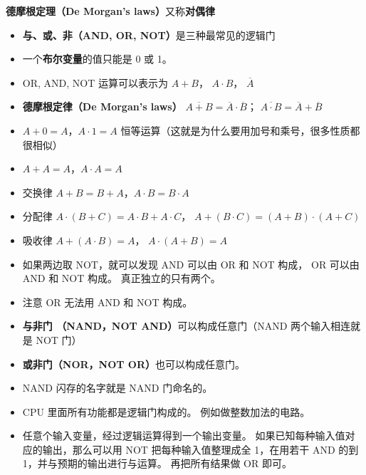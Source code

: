 
\begin{issues}
\issueDraft
\end{issues}

\textbf{德摩根定理（De Morgan's laws）}又称\textbf{对偶律}

\begin{itemize}
\item \textbf{与、或、非（AND, OR, NOT）}是三种最常见的逻辑门
\item 一个\textbf{布尔变量}的值只能是 0 或 1。
\item OR, AND, NOT 运算可以表示为 $A + B$， $A\cdot B$， $\overline A$
\item \textbf{德摩根定律（De Morgan's laws）} $\overline{A+B} = \overline A \cdot \overline B$； $\overline{A \cdot B} = \overline A + \overline B$
\item $A+0=A$，$A\cdot 1=A$ 恒等运算（这就是为什么要用加号和乘号，很多性质都很相似）
\item $A+A=A$，$A\cdot A=A$
\item 交换律 $A+B=B+A$，$A\cdot B=B\cdot A$
\item 分配律 $A\cdot(B+C)=A\cdot B+A\cdot C$， $A+(B\cdot C) = (A+B)\cdot(A+C)$
\item 吸收律 $A+(A\cdot B) = A$， $A\cdot(A+B) = A$
\item 如果两边取 NOT，就可以发现 AND 可以由 OR 和 NOT 构成， OR 可以由 AND 和 NOT 构成。 真正独立的只有两个。
\item 注意 OR 无法用 AND 和 NOT 构成。
\item \textbf{与非门 （NAND，NOT AND）}可以构成任意门（NAND 两个输入相连就是 NOT 门）
\item \textbf{或非门（NOR，NOT OR）}也可以构成任意门。 
\item NAND 闪存的名字就是 NAND 门命名的。
\item CPU 里面所有功能都是逻辑门构成的。 例如做整数加法的电路。
\item 任意个输入变量，经过逻辑运算得到一个输出变量。 如果已知每种输入值对应的输出，那么可以用 NOT 把每种输入值整理成全 1，在用若干 AND 的到 1，并与预期的输出进行与运算。 再把所有结果做 OR 即可。
\end{itemize}
